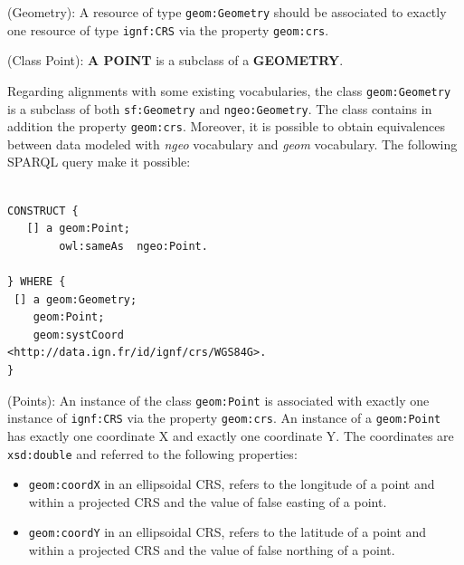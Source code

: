 \begin{deflda}
(Geometry): A resource of type \texttt{geom:Geometry} should be associated to exactly one resource of type \texttt{ignf:CRS} via the property \texttt{geom:crs}.
\end{deflda}

\begin{deflda}
(Class Point): \textbf{A POINT} is a subclass of a \textbf{GEOMETRY}.
\end{deflda}

Regarding alignments with some existing vocabularies, the class \texttt{geom:Geometry} is a subclass of both \texttt{sf:Geometry} and \texttt{ngeo:Geometry}. The class contains in addition the property \texttt{geom:crs}. Moreover, it is possible to obtain equivalences between data modeled with \emph{ngeo} vocabulary and \emph{geom} vocabulary. The following SPARQL query make it possible:

\begin{lstlisting}

CONSTRUCT {
   [] a geom:Point;
    	owl:sameAs  ngeo:Point.
 
} WHERE {
 [] a geom:Geometry;
	geom:Point;
	geom:systCoord
<http://data.ign.fr/id/ignf/crs/WGS84G>.
}

\end{lstlisting}


\begin{deflda}
(Points): An instance of the class \texttt{geom:Point} is associated with exactly one instance of \texttt{ignf:CRS} via the property \texttt{geom:crs}. An instance of a \texttt{geom:Point} has exactly one coordinate X and exactly one coordinate Y. The coordinates are \texttt{xsd:double} and referred to the following properties:
\begin{itemize}
 \item \texttt{geom:coordX} in an ellipsoidal CRS, refers to the longitude of a point and within a projected CRS and the value of false easting of a point.
 \item \texttt{geom:coordY} in an ellipsoidal CRS, refers to the latitude of a point and within a projected CRS and the value of false northing of a point.
\end{itemize}
\end{deflda}


